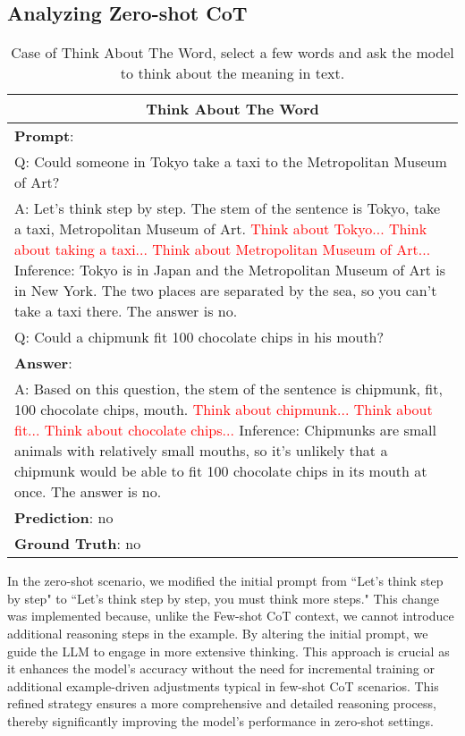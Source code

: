 \subsection{Analyzing Zero-shot CoT}
\begin{table*}[t]
\small
  \caption{Case of Think About The Word, select a few words and ask the model to think about the meaning in text.}
  \label{Think}
  \begin{tabularx}{\textwidth}{X}
    \toprule
    \multicolumn{1}{c}{\textbf{Think About The Word}} \\
    \midrule
    \textbf{Prompt}: \\
    Q: Could someone in Tokyo take a taxi to the Metropolitan Museum of Art?\\
    A: Let's think step by step. The stem of the sentence is Tokyo, take a taxi, Metropolitan Museum of Art. \textcolor{red}{Think about Tokyo... Think about taking a taxi... Think about Metropolitan Museum of Art...} Inference: Tokyo is in Japan and the Metropolitan Museum of Art is in New York. The two places are separated by the sea, so you can't take a taxi there. The answer is no. \\
    \midrule
    Q: Could a chipmunk fit 100 chocolate chips in his mouth?\\
    \textbf{Answer}:\\
    A: Based on this question, the stem of the sentence is chipmunk, fit, 100 chocolate chips, mouth. \textcolor{red}{Think about chipmunk... Think about fit... Think about chocolate chips...} Inference: Chipmunks are small animals with relatively small mouths, so it's unlikely that a chipmunk would be able to fit 100 chocolate chips in its mouth at once. The answer is no.\\
    \textbf{Prediction}: no\\
    \textbf{Ground Truth}: no\\
    \bottomrule
  \end{tabularx}
\end{table*}

In the zero-shot scenario, we modified the initial prompt from ``Let's think step by step" to ``Let's think step by step, you must think more steps." This change was implemented because, unlike the Few-shot CoT context, we cannot introduce additional reasoning steps in the example. By altering the initial prompt, we guide the LLM to engage in more extensive thinking. This approach is crucial as it enhances the model's accuracy without the need for incremental training or additional example-driven adjustments typical in few-shot CoT scenarios. This refined strategy ensures a more comprehensive and detailed reasoning process, thereby significantly improving the model's performance in zero-shot settings.

